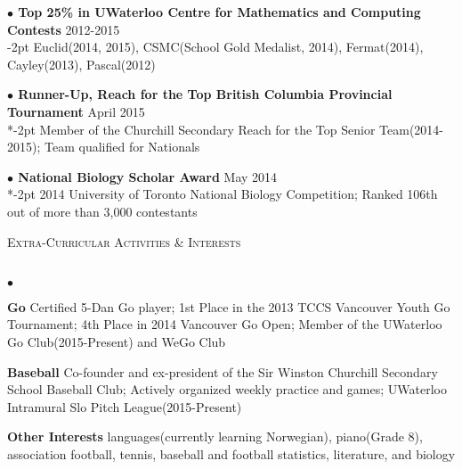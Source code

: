 \documentclass{article}
\newcommand{\lineunder}{\vspace*{-8pt} \\ \hspace*{-18pt} \hrulefill \\}
\newcommand{\header}[1]{{\hspace*{-15pt}\vspace*{6pt} \textsc{#1}} \vspace*{-6pt} \lineunder}
\newenvironment{achievements}{\begin{list}{$\bullet$}{\topsep 0pt \itemsep -2pt}}{\vspace*{4pt}\end{list}}
\newcommand{\award}[3]{\textbf{$\bullet$ \hspace{2bp}#1} \hfill{#2} \\ \vspace{2pt}
}
\begin{document}
\award{Top 25\% in UWaterloo Centre for Mathematics and Computing Contests}{2012-2015}

\vspace{-2pt}
\hspace{8bp}
Euclid(2014, 2015), CSMC(School Gold Medalist, 2014), Fermat(2014), Cayley(2013), Pascal(2012)

\award{Runner-Up, Reach for the Top British Columbia Provincial Tournament}{April 2015}

\vspace*{-2pt}
\hspace{8bp}
Member of the Churchill Secondary Reach for the Top Senior Team(2014-2015); Team qualified for Nationals

\award{National Biology Scholar Award}{May 2014}

\vspace*{-2pt}
\hspace{8bp}
2014 University of Toronto National Biology Competition; Ranked 106th out of more than 3,000 contestants

\vspace*{5pt}

\header{Extra-Curricular Activities \& Interests}
\begin{achievements}
\item \textbf{Go} \hspace{3bp}Certified 5-Dan Go player; 1st Place in the 2013 TCCS Vancouver Youth Go Tournament; 4th Place in 2014 Vancouver Go Open; Member of the UWaterloo Go Club(2015-Present) and WeGo Club
\item \textbf{Baseball}	\hspace{3bp}Co-founder and ex-president of the Sir Winston Churchill Secondary School Baseball Club; Actively organized weekly practice and games; UWaterloo Intramural Slo Pitch League(2015-Present)
\item \textbf{Other Interests} \hspace{3bp}languages(currently learning Norwegian), piano(Grade 8), association football, tennis, baseball and football statistics, literature, and biology
\end{achievements}
\end{document}
